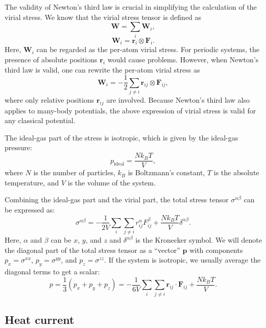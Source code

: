 \documentclass[12pt,a4paper]{report}
\newcommand{\vect}[1]{\boldsymbol{#1}}
\begin{document}
The validity of Newton's third law is crucial in simplifying the calculation of the virial stress. We know that the virial stress tensor is defined as
\begin{equation}
\textbf{W} = \sum_i \textbf{W}_i,
\end{equation}
\begin{equation}
\textbf{W}_i =
\vect{r}_{i} \otimes \vect{F}_{i}.
\end{equation}
Here, $\textbf{W}_i$ can be regarded as the per-atom virial stress. For periodic systems, the presence of absolute positions $\vect{r}_i$ would cause problems. However, when Newton's third law is valid, one can rewrite the per-atom virial stress as
\begin{equation}
\boxed{
\textbf{W}_i = -\frac{1}{2} \sum_{j \neq i} \vect{r}_{ij} \otimes \vect{F}_{ij}
},
\end{equation}
where only relative positions $\vect{r}_{ij}$ are involved. Because Newton's third law also applies to many-body potentials, the above expression of virial stress is valid for any classical potential.

The ideal-gas part of the stress is isotropic, which is given by the ideal-gas pressure:
\begin{equation}
p_{\text{ideal}}=\frac{Nk_BT}{V},
\end{equation}
where $N$ is the number of particles, $k_B$ is Boltzmann's constant, $T$ is the absolute temperature, and $V$ is the volume of the system.

Combining the ideal-gas part and the virial part, the total stress tensor $\sigma^{\alpha \beta}$ can be expressed as:
\begin{equation}
\sigma^{\alpha \beta} = -\frac{1}{2V} \sum_i \sum_{j \neq i}
r^{\alpha}_{ij} F^{\beta}_{ij} + \frac{Nk_BT}{V} \delta^{\alpha\beta}.
\end{equation}
Here, $\alpha$ and $\beta$ can be $x$, $y$, and $z$ and $\delta^{\alpha\beta}$ is the Kronecker symbol. We will denote the diagonal part of the total stress tensor as a ``vector'' $\vect{p}$ with components $p_x=\sigma^{xx}$, $p_y=\sigma^{yy}$, and $p_z=\sigma^{zz}$.
If the system is isotropic, we usually average the diagonal terms to get a scalar:
\begin{equation}
p = \frac{1}{3} \left(p_{x} + p_{y} + p_{z}\right) =
-\frac{1}{6V} \sum_i \sum_{j \neq i} \vect{r}_{ij} \cdot \vect{F}_{ij}
+ \frac{Nk_BT}{V}.
\end{equation}


\subsection{Heat current}
\end{document}
